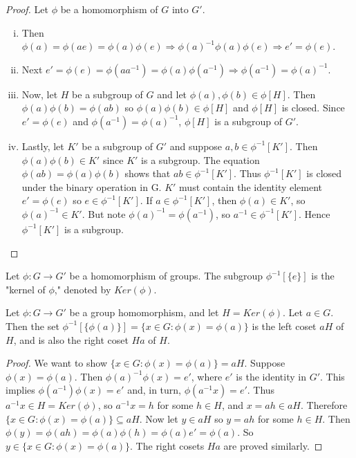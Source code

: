 \documentclass[a4paper,11pt]{article}
\begin{document}
\begin{outline}
    \begin{proof}
      Let \(\phi\) be a homomorphism of \(G\) into \(G'\).
      \begin{enumerate}[i.]
        \item 
          Then \(\phi(a) = \phi(ae) = \phi(a)\phi(e) \Rightarrow \phi(a)^{-1}\phi(a)\phi(e) \Rightarrow e' = \phi(e)\).
        \item 
          Next \(e' = \phi(e) = \phi(aa^{-1}) = \phi(a)\phi(a^{-1}) \Rightarrow \phi(a^{-1}) = \phi(a)^{-1}\).
        \item 
          Now, let \(H\) be a subgroup of \(G\) and let \(\phi(a), \phi(b) \in \phi[H]\). Then \(\phi(a)\phi(b) = 
          \phi(ab)\) so \(\phi(a)\phi(b) \in \phi[H]\) and \(\phi[H]\) is closed. Since \(e' = \phi(e)\) and 
          \(\phi(a^{-1}) = \phi(a)^{-1}\), \(\phi[H]\) is a subgroup of \(G'\).
        \item 
          Lastly, let \(K'\) be a subgroup of \(G'\) and suppose \(a, b \in \phi^{-1}[K']\). Then
          \(\phi(a)\phi(b) \in K'\) since \(K'\) is a subgroup. The equation \(\phi(ab) = \phi(a)\phi(b)\) shows that
          \(ab \in \phi^{-1}[K']\). Thus \(\phi^{-1}[K']\) is closed under the binary operation in G. \(K'\) must contain
          the identity element \(e' = \phi(e)\) so \(e \in \phi^{-1}[K']\). If \(a \in \phi^{-1}[K']\), then
          \(\phi(a) \in K'\), so \(\phi(a)^{-1} \in K'\). But note \(\phi(a)^{-1} = \phi(a^{-1})\), so \(a^{-1} \in
          \phi^{-1}[K']\). Hence \(\phi^{-1}[K']\) is a subgroup.
      \end{enumerate}
    \end{proof}

    Let \(\phi: G \rightarrow G'\) be a homomorphism of groups. The subgroup \(\phi^{-1}[\{e\}]\) is
    the "kernel of \(\phi\)," denoted by \(Ker(\phi)\).
    
    Let \(\phi: G \rightarrow G'\) be a group homomorphism, and let \(H = Ker(\phi)\). Let \(a \in G\).
    Then the set \(\phi^{-1}[\{\phi(a)\}] = \{x \in G : \phi(x) = \phi(a)\}\) is the left coset \(aH\) of \(H\), and is
    also the right coset \(Ha\) of \(H\). 
    
    \begin{proof}
      We want to show \(\{x \in G : \phi(x) = \phi(a)\} = aH\). Suppose \(\phi(x) = \phi(a)\). Then \(\phi(a)^{-1}\phi(x)
      = e'\), where \(e'\) is the identity in \(G'\). This implies \(\phi(a^{-1})\phi(x) = e'\) and, in turn, \(\phi(a^{-1}x)
      = e'\). Thus \(a^{-1}x \in H = Ker(\phi)\), so \(a^{-1}x = h\) for some \(h \in H\), and \(x = ah \in aH\). Therefore
      \(\{x \in G : \phi(x) = \phi(a)\} \subseteq aH\). Now let \(y \in aH\) so \(y = ah\) for some \(h \in H\). Then
      \(\phi(y) = \phi(ah) = \phi(a)\phi(h) = \phi(a)e' = \phi(a)\). So \(y \in \{x \in G : \phi(x) = \phi(a)\}\). The
      right cosets \(Ha\) are proved similarly.
    \end{proof}
    

\end{outline}
\end{document}
